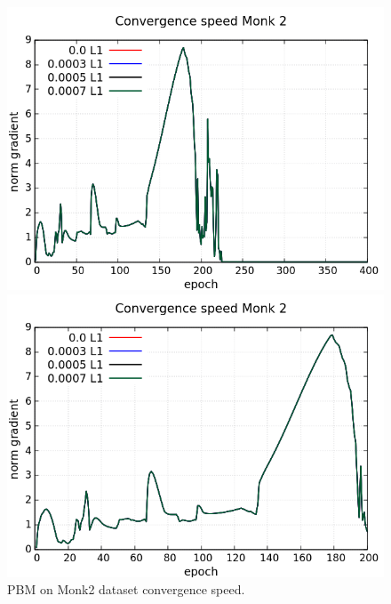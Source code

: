 \begin{figure}[H]
	\centering
	\begin{minipage}[t]{0.5\linewidth}
		\includegraphics[width=\linewidth]{data/PBM/Monk2/Monk2_PBM_L1_CS_standard.png}
	\end{minipage}%
	\begin{minipage}[t]{0.5\linewidth}
		\includegraphics[width=\linewidth]{data/PBM/Monk2/Monk2_PBM_L1_CS_zoom.png}
	\end{minipage}
	\caption{PBM on Monk2 dataset convergence speed.}
\end{figure}
